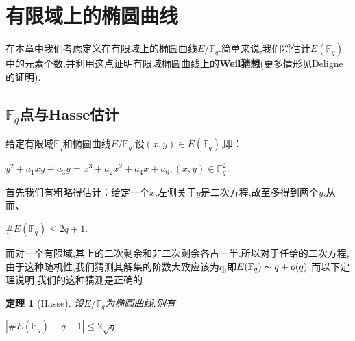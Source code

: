 \documentclass[11pt]{ctexart}
\newtheorem{thm}{定理}[section]
\begin{document}
\section{有限域上的椭圆曲线}
在本章中我们考虑定义在有限域上的椭圆曲线$E/\mathbb{F}_q$.简单来说,我们将估计$E(\mathbb{F}_q)$中的元素个数,并利用这点证明有限域椭圆曲线上的\textbf{Weil猜想}(更多情形见Deligne的证明\cite{Weil1}\cite{Weil2}).

\subsection{$\mathbb{F}_q$点与Hasse估计}
给定有限域$\mathbb{F}_q$和椭圆曲线$E/\mathbb{F}_q$,设$(x,y) \in E(\mathbb{F}_q)$,即：
\begin{center}
    $y^2+a_1xy+a_3y=x^3+a_2x^2+a_4x+a_6,(x,y)\in \mathbb{F}_q^2$.
\end{center}
\noindent 首先我们有粗略得估计：给定一个$x$,左侧关于$y$是二次方程,故至多得到两个$y$,从而、
\begin{center}
    $\#E(\mathbb{F}_q)\leqslant 2q+1$.
\end{center}
而对一个有限域,其上的二次剩余和非二次剩余各占一半.所以对于任给的二次方程,由于这种随机性,我们猜测其解集的阶数大致应该为q,即$E(\mathbb{F}_q)\thicksim q+o(q)$.而以下定理说明,我们的这种猜测是正确的
\begin{thm}[Hasse]设$E/\mathbb{F}_q$为椭圆曲线,则有
    \begin{center}
        $|\#E(\mathbb{F}_q)-q-1|\leqslant 2\sqrt{q}$
    \end{center}

\end{thm}
\end{document}
